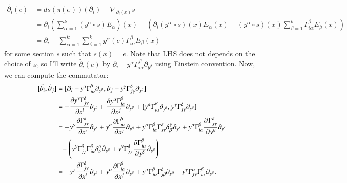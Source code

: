 \documentclass[a4paper, 12pt]{article}
\theoremstyle{Mydefinition}
\theoremstyle{Mytheorem}
\begin{document}
\begin{equation*}
    \begin{split}
        \tilde{\partial_i}(e) &= ds(\pi(e))(\partial_i) - \nabla_{\partial_i(x)} s \\
        &= \partial_i(\sum_{\alpha=1}^k (y^\alpha \circ s)E_\alpha)(x) - (\partial_i(y^\alpha \circ s)(x)E_\alpha(x) + (y^\alpha \circ s)(x)\sum_{\beta=1}^k \Gamma_{i\alpha}^\beta E_\beta(x))\\
        &=\partial_i - \sum_{\alpha=1}^k \sum_{\beta=1}^k y^\alpha(e)\Gamma_{i\alpha}^\beta E_\beta(x)
    \end{split}
\end{equation*}
for some section $s$ such that $s(x) = e$. Note that LHS does not depends on the choice of $s$, so I'll write $\tilde{\partial_i}(e)$ by $\partial_i - y^\alpha \Gamma_{i\alpha}^\beta \partial_{y^\beta}$ using Einstein convention. Now, we can compute the commutator:
\begin{equation*}
\begin{split}
    [\tilde{\partial_i}, \tilde{\partial_j}] &= [\partial_i - y^\alpha \Gamma_{i\alpha}^\beta \partial_{y^\beta}, \partial_j - y^\gamma \Gamma_{j\gamma}^\delta \partial_{y^\delta}] \\
    &=-\pdv{y^\gamma \Gamma_{j\gamma}^\delta}{x^i}\partial_{y^\delta} + \pdv{y^\alpha \Gamma_{i\alpha}^\beta}{x^j}\partial_{y^\beta} + [y^\alpha \Gamma_{i\alpha}^\beta\partial_{y^\beta}, y^\gamma \Gamma_{j\gamma}^\delta \partial_{y^\delta}]\\
    &=-y^\gamma \pdv{\Gamma^\delta_{j\gamma}}{x^i}\partial_{y^\delta} + y^\alpha \pdv{\Gamma^\beta_{i\alpha}}{x^j}\partial_{y^\beta} + y^\alpha \Gamma^\beta_{i\alpha} \Gamma_{j\gamma}^\delta\delta_\beta^\gamma\partial_{y^\delta} + y^\alpha \Gamma^\beta_{i\alpha} \pdv{\Gamma_{j\gamma}^\delta}{y^\beta}\partial_{y^\delta} \\
    &\phantom{=}-\left(y^\gamma \Gamma^\delta_{j\gamma} \Gamma_{i\alpha}^\delta\delta_\delta^\alpha\partial_{y^\beta} + y^\gamma \Gamma^\delta_{j\gamma} \pdv{\Gamma_{i\alpha}^\beta}{y^\delta}\partial_{y^\beta}\right)\\
    &=-y^\gamma \pdv{\Gamma^\delta_{j\gamma}}{x^i}\partial_{y^\delta} + y^\alpha \pdv{\Gamma^\beta_{i\alpha}}{x^j}\partial_{y^\beta} + y^\alpha \Gamma^\beta_{i\alpha} \Gamma_{j\beta}^\delta\partial_{y^\delta}-y^\gamma \Gamma^\alpha_{j\gamma} \Gamma_{i\alpha}^\beta\partial_{y^\beta}.
\end{split}
\end{equation*}
\end{document}

